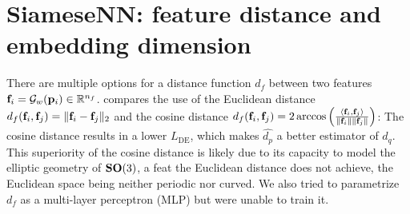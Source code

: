 \section{SiameseNN: feature distance and embedding dimension}\label{apx:siamese:feature-distance-and-embedding-dimension}


There are multiple options for a distance function $d_f$ between two features $\mathbf{f}_i = \mathcal{G}_w(\mathbf{p}_i) \in \mathbb{R}^{n_f}$.
 compares the use of the Euclidean distance $d_f(\mathbf{f}_i, \mathbf{f}_j) = \Vert \mathbf{f}_i - \mathbf{f}_j \Vert_2$ and the cosine distance $d_f(\mathbf{f}_i, \mathbf{f}_j) = 2 \arccos \left( \frac{\langle \mathbf{f}_i, \mathbf{f}_j \rangle}{\lVert \mathbf{f}_i \rVert \lVert \mathbf{f}_j \rVert} \right)$: The cosine distance results in a lower $L_\text{DE}$, which makes $\widehat{d_p}$ a better estimator of $d_q$.
This superiority of the cosine distance is likely due to its capacity to model the elliptic geometry of $\mathrm{\mathbf{SO}}(3)$, a feat the Euclidean distance does not achieve, the Euclidean space being neither periodic nor curved.
We also tried to parametrize $d_f$ as a multi-layer perceptron (MLP) but were unable to train it.


